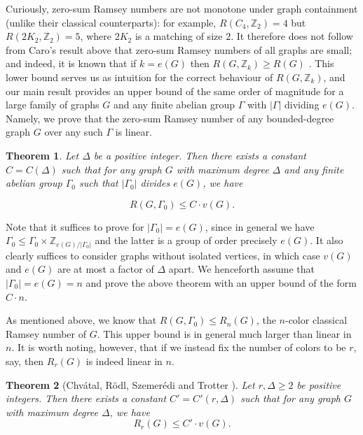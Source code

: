 \documentclass{article}
\newtheorem{theorem}{Theorem}[section]
\theoremstyle{definition}
\begin{document}
Curiously, zero-sum Ramsey numbers are not monotone under graph containment (unlike their classical counterparts): for example, $R(C_4, \mathbb{Z}_2)=4$ but $R(2K_2, \mathbb{Z}_2)=5$, where $2K_2$ is a matching of size $2$. It therefore does not follow from Caro's result above that zero-sum Ramsey numbers of all graphs are small; and indeed, it is known that if $k=e(G)$ then $R(G, \mathbb{Z}_k)\geq R(G)$ \cite{BD92,Caro92}. This lower bound serves us as intuition for the correct behaviour of $R(G, \mathbb{Z}_k)$, and our main result provides an upper bound of the same order of magnitude for a large family of graphs $G$ and any finite abelian group $\Gamma$ with $|\Gamma|$ dividing $e(G)$. Namely, we prove that the zero-sum Ramsey number of any bounded-degree graph $G$ over any such $\Gamma$ is linear. 


\begin{theorem}\label{main}
    Let $\Delta$ be a positive integer. Then there exists a constant $C=C(\Delta)$ such that for any graph $G$ with maximum degree $\Delta$ and any finite abelian group $\Gamma_0$ such that $|\Gamma_0|$ divides $e(G)$, we have

    $$ R(G, \Gamma_0)\leq C\cdot v(G).$$
\end{theorem}

Note that it suffices to prove  for $|\Gamma_0|=e(G)$, since in general we have $\Gamma_0\leqslant\Gamma_0 \times \mathbb{Z}_{e(G)/|\Gamma_0|}$ and the latter is a group of order precisely $e(G)$. It also clearly suffices to consider graphs without isolated vertices, in which case $v(G)$ and $e(G)$ are at most a factor of $\Delta$ apart. We henceforth assume that $|\Gamma_0|=e(G)=n$ and prove the above theorem with an upper bound of the form $C\cdot n$.

As mentioned above, we know that $R(G, \Gamma_0)\leq R_n(G)$, the $n$-color classical Ramsey number of $G$. This upper bound is in general much larger than linear in $n$. It is worth noting, however, that if we instead fix the number of colors to be $r$, say, then $R_r(G)$ is indeed linear in $n$.

\begin{theorem}[Chv\'atal, R\"odl, Szemer\'edi and Trotter \cite{ChRSzT}]
    \label{ramseylinear}
    Let $r, \Delta\geq 2$ be positive integers. Then there exists a constant $C'=C'(r, \Delta)$ such that for any graph $G$ with maximum degree $\Delta$, we have 
    \[R_r(G)\leq C'\cdot v(G).\]
\end{theorem}
\end{document}
